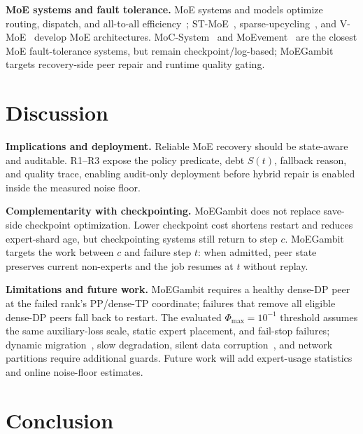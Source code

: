 \documentclass[10pt,conference]{IEEEtran}
\begin{document}
\textbf{MoE systems and fault tolerance.} MoE systems and models optimize routing, dispatch, and all-to-all efficiency~\cite{lepikhin2021gshard,fedus2022switch,rajbhandari2022deepspeedmoe,hwang2023tutel,he2022fastermoe,zhai2023smartmoe,gale2023megablocks,jiang2024mixtral,dai2024deepseekmoe,deepseekv3,qwen3report,ling2025bailing,ling2025ringlinear,kimi2025k2}; ST-MoE~\cite{zoph2022stmoe}, sparse-upcycling~\cite{komatsuzaki2023sparse}, and V-MoE~\cite{riquelme2021vmoe} develop MoE architectures. MoC-System~\cite{cai2024moc} and MoEvement~\cite{gandhi2026moevement} are the closest MoE fault-tolerance systems, but remain checkpoint/log-based; MoEGambit targets recovery-side peer repair and runtime quality gating.

\section{Discussion}
\label{sec:discussion}

\textbf{Implications and deployment.} Reliable MoE recovery should be state-aware and auditable. R1--R3 expose the policy predicate, debt $S(t)$, fallback reason, and quality trace, enabling audit-only deployment before hybrid repair is enabled inside the measured noise floor.

\textbf{Complementarity with checkpointing.} MoEGambit does not replace save-side checkpoint optimization. Lower checkpoint cost shortens restart and reduces expert-shard age, but checkpointing systems still return to step $c$. MoEGambit targets the work between $c$ and failure step $t$: when admitted, peer state preserves current non-experts and the job resumes at $t$ without replay.

\textbf{Limitations and future work.} MoEGambit requires a healthy dense-DP peer at the failed rank's PP/dense-TP coordinate; failures that remove all eligible dense-DP peers fall back to restart. The evaluated $\Phi_{\max}=10^{-1}$ threshold assumes the same auxiliary-loss scale, static expert placement, and fail-stop failures; dynamic migration~\cite{he2022fastermoe}, slow degradation, silent data corruption~\cite{hochschild2021cores}, and network partitions require additional guards. Future work will add expert-usage statistics and online noise-floor estimates.

\section{Conclusion}
\label{sec:conclusion}
\end{document}
